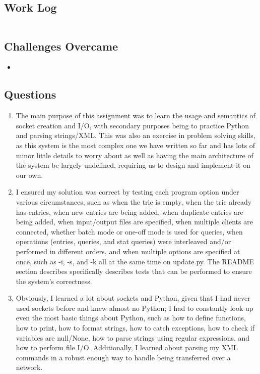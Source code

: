 \documentclass[letterpaper,10pt,fleqn]{article}
\numberwithin{equation}{section}
\begin{document}
\subsection*{Work Log}
\begin{verbatim}
\end{verbatim}
\subsection*{Challenges Overcame}
\begin{itemize}
    \item
\end{itemize}

\subsection*{Questions}
\begin{enumerate}
    \item The main purpose of this assignment was to learn the usage and semantics of socket creation and I/O, with secondary purposes being to practice Python and parsing strings/XML.  This was also an exercise in problem solving skills, as this system is the most complex one we have written so far and has lots of minor little details to worry about as well as having the main architecture of the system be largely undefined, requiring us to design and implement it on our own.
    \item I ensured my solution was correct by testing each program option under various circumstances, such as when the trie is empty, when the trie already has entries, when new entries are being added, when duplicate entries are being added, when input/output files are specified, when multiple clients are connected, whether batch mode or one-off mode is used for queries, when operations (entries, queries, and stat queries) were interleaved and/or performed in different orders, and when multiple options are specified at once, such as -i, -s, and -k all at the same time on update.py.  The README section describes specifically describes tests that can be performed to ensure the system's correctness.
    \item Obviously, I learned a lot about sockets and Python, given that I had never used sockets before and knew almost no Python; I had to constantly look up even the most basic things about Python, such as how to define functions, how to print, how to format strings, how to catch exceptions, how to check if variables are null/None, how to parse strings using regular expressions, and how to perform file I/O.  Additionally, I learned about parsing my XML commands in a robust enough way to handle being transferred over a network.
\end{enumerate}
\end{document}
